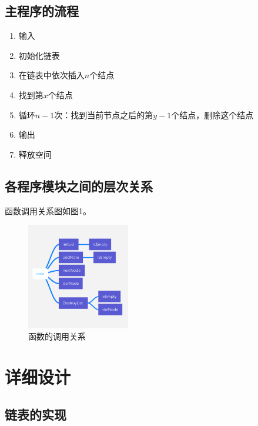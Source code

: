 \documentclass{article}
\begin{document}
\subsection{主程序的流程}

\begin{enumerate}
    \item 输入
    \item 初始化链表
    \item 在链表中依次插入$n$个结点
    \item 找到第$x$个结点
    \item 循环$n-1$次：找到当前节点之后的第$y-1$个结点，删除这个结点
    \item 输出
    \item 释放空间
\end{enumerate}

\subsection{各程序模块之间的层次关系}

函数调用关系图如图1。

\begin{figure}[htbp]
    
    \centering\includegraphics[width=0.4\textwidth]{./Images/pic1.png}
    
    \caption{函数的调用关系}
    
\end{figure}

\section{详细设计}

\subsection{链表的实现}
\end{document}
